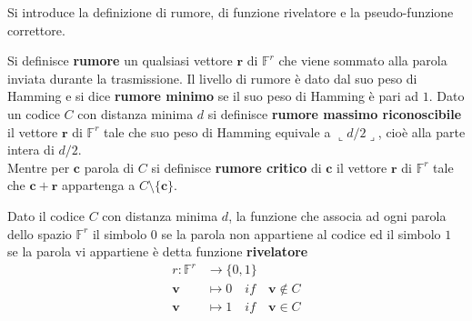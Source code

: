 \noindent
Si introduce la definizione di rumore, di funzione rivelatore e la pseudo-funzione correttore.
\begin{definizione}
   Si definisce {\bf rumore} un qualsiasi vettore $\mathbf{r} $ di $\mathbb{F}^{r}$ che viene sommato alla parola inviata durante la trasmissione. Il livello di rumore è dato dal suo peso di Hamming e si dice {\bf rumore minimo} se il suo peso di Hamming è pari ad $1$. Dato un codice $C$ con distanza minima $d$ si definisce {\bf rumore massimo riconoscibile} il vettore $\mathbf{r}$ di $\mathbb{F}^{r}$ tale che suo peso di Hamming equivale a $\llcorner d/2 \lrcorner$, cioè alla parte intera di $d/2$. \\
   Mentre per  $\mathbf{c}$ parola di $C$ si definisce {\bf rumore critico} di $\mathbf{c}$ il vettore $\mathbf{r}$ di $\mathbb{F}^{r}$ tale che $\mathbf{c}+ \mathbf{r}$ appartenga a $C \setminus \lbrace \mathbf{c} \rbrace $.
\end{definizione}

\begin{definizione}
   Dato il codice $C$ con distanza minima $d$, la funzione che associa ad ogni parola dello spazio $\mathbb{F}^{r}$ il simbolo $0$ se la parola non appartiene al codice ed il simbolo $1$ se la parola vi appartiene è detta funzione {\bf rivelatore}
   \begin{align*}
       r: \mathbb{F}^{r}   &\longrightarrow  \lbrace 0,1 \rbrace \\
            \mathbf{v}  &\longmapsto  0 \quad if \quad \mathbf{v} \notin C  \\
            \mathbf{v}  &\longmapsto  1 \quad if \quad  \mathbf{v} \in C 
   \end{align*}
\end{definizione}

